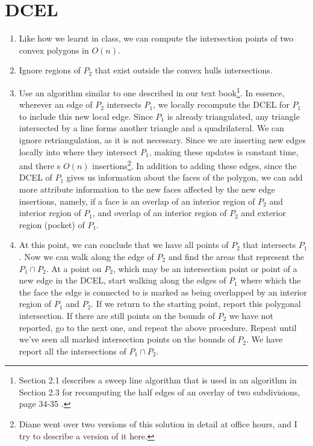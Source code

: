 \documentclass [12pt]{article}
\begin{document}
    \pagebreak



    \section{DCEL}
    \label{sec:four}

    \begin{enumerate}
        \item Like how we learnt in class, we can compute the intersection points of two convex polygons in $O(n)$. 
        \item Ignore regions of $P_2$ that exist outside the convex hulls intersections. 
        \item Use an algorithm similar to one described in our text book\footnote{Section 2.1 describes a sweep line algorithm that is used in an algorithm in Section 2.3 for recomputing the half edges of an overlay of two subdivisions, page 34-35 \cite{berg08}.}. In essence, wherever an edge of $P_2$ intersects $P_1$, we locally recompute the DCEL for $P_1$ to include this new local edge. Since $P_1$ is already triangulated, any triangle intersected by a line forms another triangle and a quadrilateral. We can ignore retriangulation, as it is not necessary. Since we are inserting new edges locally into where they intersect $P_1$, making these updates is constant time, and there s $O(n)$ insertions\footnote{Diane went over two versions of this solution in detail at office hours, and I try to describe a version of it here.}. In addition to adding these edges, since the DCEL of $P_1$ gives us information about the faces of the polygon, we can add more attribute information to the new faces affected by the new edge insertions, namely, if a face is an overlap of an interior region of $P_2$ and interior region of $P_1$, and overlap of an interior region of $P_2$ and exterior region (pocket) of $P_1$.
        
        \item At this point, we can conclude that we have all points of $P_2$ that intersects $P_1$. Now we can walk along the edge of $P_2$ and find the areas that represent the $P_1 \cap P_2$. At a point on $P_2$, which may be an intersection point or point of a new edge in the DCEL, start walking along the edges of $P_1$ where which the the face the edge is connected to is marked as being overlapped by an interior region of $P_1$ and $P_2$. If we return to the starting point, report this polygonal intersection. If there are still points on the bounds of $P_2$ we have not reported, go to the next one, and repeat the above procedure. Repeat until we've seen all marked intersection points on the bounds of $P_2$. We have report all the intersections of $P_1 \cap P_2$.
    \end{enumerate}
\end{document}
